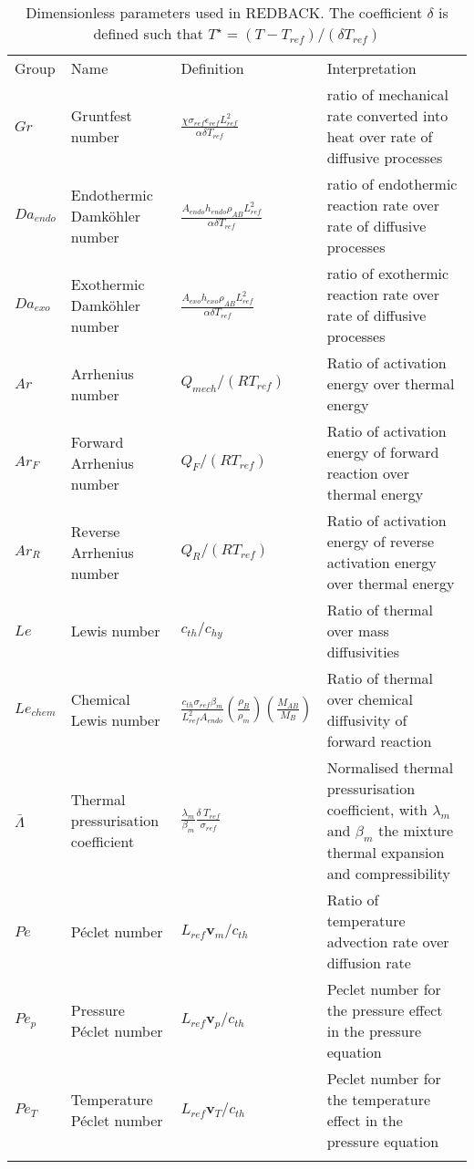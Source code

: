 \documentclass[]{scrreprt}
\newcommand{\redback}{{REDBACK}}
\begin{document}
\begin{table}
  \caption{Dimensionless parameters used in \redback{}. The coefficient $\delta$ is defined
such that $T^{\star} = (T-T_{ref})/(\delta T_{ref})$}
\label{tab:dimensionless_nbs}
\begin{tabular}{@{} l p{} l p{} @{}}
\hline\noalign{\smallskip}
Group & Name & Definition & Interpretation \\
\noalign{\smallskip}\hline\noalign{\smallskip}
$Gr$ & Gruntfest number & $\frac{\chi\sigma_{ref}\dot{\epsilon}_{ref} L^2_{ref}}{\alpha \delta T_{ref}}$ & ratio of mechanical rate converted into heat over rate of diffusive processes \\
$Da_{endo}$ & Endothermic Damk\"{o}hler number & $\frac{A_{endo} h_{endo} \rho_{AB} L^2_{ref}}{\alpha \delta T_{ref}}$ & ratio of endothermic reaction rate over rate of diffusive processes \\
$Da_{exo}$ & Exothermic Damk\"{o}hler number & $\frac{A_{exo} h_{exo} \rho_{AB} L^2_{ref}}{\alpha \delta T_{ref}}$ & ratio of exothermic reaction rate over rate of diffusive processes \\
$Ar$ & Arrhenius number & $Q_{mech}/(R T_{ref})$ & Ratio of activation energy over thermal energy \\
$Ar_F$ & Forward Arrhenius number & $Q_F/(R T_{ref})$ & Ratio of activation energy of forward reaction over thermal energy \\
$Ar_R$ & Reverse Arrhenius number & $Q_R/(R T_{ref})$ & Ratio of activation energy of reverse activation energy over thermal energy \\
$Le$ & Lewis number & $c_{th}/c_{hy}$ & Ratio of thermal over mass diffusivities \\
$Le_{chem}$ & Chemical Lewis number & $\frac{c_{th}\sigma_{ref}\beta_m }{L^2_{ref} A_{endo}}\left(\frac{\rho_{B}}{\rho_m} \right)\left(\frac{M_{AB}}{M_{B}} \right)$ & Ratio of thermal over chemical diffusivity of forward reaction \\
$\bar{\Lambda}$ & Thermal pressurisation coefficient & $\frac{\lambda_m}{\beta_m}\frac{\delta \:T_{ref}}{\sigma_{ref}}$ & Normalised thermal pressurisation coefficient, with $\lambda_m$ and $\beta_m$ the mixture thermal expansion and compressibility \\
$Pe$ & P\'{e}clet number & $L_{ref}\textbf{v}_m/c_{th}$ & Ratio of temperature advection rate over diffusion rate \\
$Pe_p$ & Pressure P\'{e}clet number & $L_{ref}\textbf{v}_p/c_{th}$ & Peclet number for the pressure effect in the pressure equation \\
$Pe_T$ & Temperature P\'{e}clet number & $L_{ref}\textbf{v}_T/c_{th}$ & Peclet number for the temperature effect in the pressure equation \\
\noalign{\smallskip}\hline
\end{tabular}
\end{table}
\end{document}

